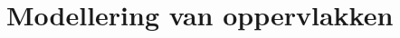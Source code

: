 \documentclass[computergesteund_ontwerp_van_curven_en_oppervlakken.tex]{subfiles}
\begin{document}
\chapter{Modellering van oppervlakken}
\end{document}
